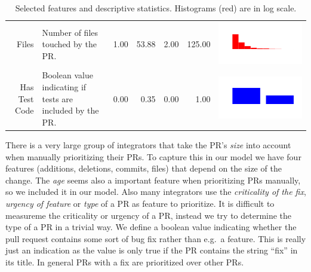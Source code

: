 \begin{table}[ht]
\begin{tabular}{rp{20em}rrrrc}
    Files & Number of files touched by the PR. & 1.00 & 53.88 & 2.00 & 125.00 & \includegraphics[scale = 0.1, clip = true, trim= 50px 60px 50px 60px]{../figs/hist-features/hist-files.pdf} \\
    Has Test Code & Boolean value indicating if tests are included by the PR. & 0.00 & 0.35 & 0.00 & 1.00 & \includegraphics[scale = 0.1, clip = true, trim= 50px 60px 50px 60px]{../figs/hist-features/hist-hasTestCode.pdf} \\
    \hline
  \end{tabular}
  \caption{Selected features and descriptive statistics. Histograms (red) are in log scale.}
  \label{tab:features}
\end{table}

There is a very large group of integrators that take the PR's \emph{size} into account when manually prioritizing their PRs.
To capture this in our model we have four features (additions, deletions, commits, files) that depend on the size of the change.
The \emph{age} seems also a important feature when prioritizing PRs manually, so we included it in our model.
Also many integrators use the \emph{criticality of the fix}, \emph{urgency of feature} or \emph{type} of a PR as feature to prioritize.
It is difficult to measureme the criticality or urgency of a PR, instead we try to determine the type of a PR in a trivial way.
We define a boolean value indicating whether the pull request contains some sort of bug fix rather than e.g.\ a feature.
This is really just an indication as the value is only true if the PR contains the string ``fix'' in its title.
In general PRs with a fix are prioritized over other PRs.

